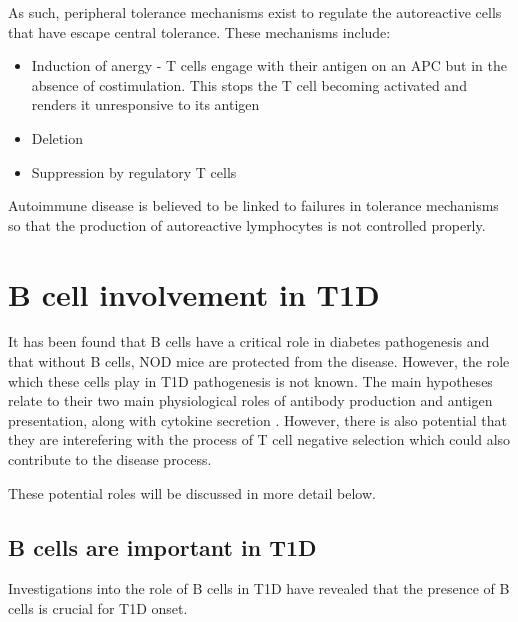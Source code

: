 As such, peripheral tolerance mechanisms exist to regulate the autoreactive cells that have escape central tolerance.
These mechanisms include:
\begin{itemize}
\item Induction of anergy - T cells engage with their antigen on an APC but in the absence of costimulation. This stops the T cell becoming activated and renders it unresponsive to its antigen\citep{Abbas2004}
\item Deletion\citep{Abbas2004}
\item Suppression by regulatory T cells\citep{Abbas2004}
\end{itemize}

Autoimmune disease is believed to be linked to failures in tolerance mechanisms so that the production of autoreactive lymphocytes is not controlled properly.



\section{B cell involvement in T1D}
\label{sec:BcellsinT1D}

It has been found that B cells have a critical role in diabetes pathogenesis and that without B cells, NOD mice are protected from the disease.
However, the role which these cells play in T1D pathogenesis is not known.
The main hypotheses relate to their two main physiological roles of antibody production and antigen presentation, along with cytokine secretion \citep{Hinman2014}.
However, there is also potential that they are interefering with the process of T cell negative selection which could also contribute to the disease process.

These potential roles will be discussed in more detail below.

\subsection{B cells are important in T1D}

Investigations into the role of B cells in T1D have revealed that the presence of B cells is crucial for T1D onset.

